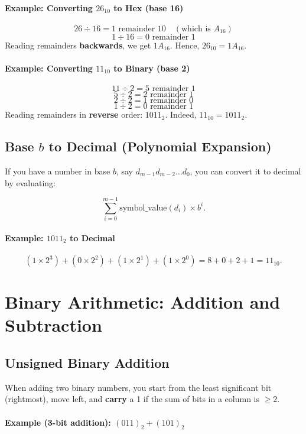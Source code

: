 \documentclass[12pt]{article}
\begin{document}
\paragraph{Example: Converting \(26_{10}\) to Hex (base 16)}
\[
  26 \div 16 = 1 \text{ remainder } 10 
  \quad(\text{which is }A_{16})
\]
\[
  1 \div 16 = 0 \text{ remainder } 1
\]
Reading remainders \textbf{backwards}, we get \(1A_{16}\). Hence, \(26_{10} = 1A_{16}\).

\paragraph{Example: Converting \(11_{10}\) to Binary (base 2)}
\[
  11 \div 2 = 5 \text{ remainder } 1
\]
\[
  5 \div 2 = 2 \text{ remainder } 1
\]
\[
  2 \div 2 = 1 \text{ remainder } 0
\]
\[
  1 \div 2 = 0 \text{ remainder } 1
\]
Reading remainders in \textbf{reverse} order: \(1011_2\). Indeed, \(11_{10} = 1011_{2}\).

\subsection{Base \(b\) to Decimal (Polynomial Expansion)}

If you have a number in base \(b\), say \(d_{m-1} d_{m-2} \dots d_{0}\), you can convert it to decimal by evaluating:

$$
  \sum_{i=0}^{m-1} \mathrm{symbol\_value}(d_i) \times b^i.
$$

\paragraph{Example: \(1011_{2}\) to Decimal}
\[
  (1 \times 2^3) + (0 \times 2^2) + (1 \times 2^1) + (1 \times 2^0)
  = 8 + 0 + 2 + 1
  = 11_{10}.
\]

\section{Binary Arithmetic: Addition and Subtraction}

\subsection{Unsigned Binary Addition}

When adding two binary numbers, you start from the least significant bit (rightmost), move left, and \textbf{carry} a 1 if the sum of bits in a column is \(\ge 2\).

\paragraph{Example (3-bit addition): \((011)_2 + (101)_2\)}
\end{document}
